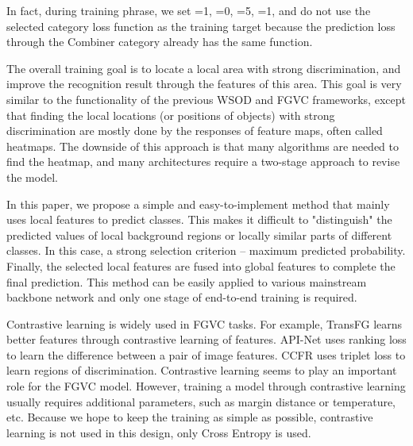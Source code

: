 \documentclass[conference]{IEEEtran}
\begin{document}
In fact, during training phrase, we set =1, =0, =5, =1, and do not use the selected category loss function  as the training target because the prediction loss  through the Combiner category already has the same function.

The overall training goal is to locate a local area with strong discrimination, and improve the recognition result through the features of this area. This goal is very similar to the functionality of the previous WSOD and FGVC frameworks, except that finding the local locations (or positions of objects) with strong discrimination are mostly done by the responses of feature maps, often called heatmaps. The downside of this approach is that many algorithms are needed to find the heatmap, and many architectures require a two-stage approach to revise the model.

In this paper, we propose a simple and easy-to-implement method that mainly uses local features to predict classes. This makes it difficult to "distinguish" the predicted values of local background regions or locally similar parts of different classes. In this case, a strong selection criterion -- maximum predicted probability. Finally, the selected local features are fused into global features to complete the final prediction. This method can be easily applied to various mainstream backbone network and only one stage of end-to-end training is required.
 
Contrastive learning is widely used in FGVC tasks. For example, TransFG\cite{TransFG} learns better features through contrastive learning of features. API-Net\cite{API_Net} uses ranking loss to learn the difference between a pair of image features. CCFR\cite{CCFR} uses triplet loss to learn regions of discrimination. Contrastive learning seems to play an important role for the FGVC model. However, training a model through contrastive learning usually requires additional parameters, such as margin distance or temperature, etc. Because we hope to keep the training as simple as possible, contrastive learning is not used in this design, only Cross Entropy is used.
\end{document}
